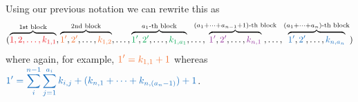 \begin{example}
\begin{center}
    \end{center}
    Using our previous notation we can rewrite this as 
    \[
        (
        \overbrace{\textcolor{Red}{1, 2, \dots, k_{1,1}}}^{1\text{st block}}, 
        \overbrace{\textcolor{Orange}{1'}, 
        \textcolor{Orange}{2'}, \dots, \textcolor{Orange}{k_{1,2}}}^{2\text{nd block}}, 
        \dots, 
        \overbrace{\textcolor{Green}{1'}, \textcolor{Green}{2'}, \dots, \textcolor{Green}{k_{1, a_1}}}^{a_1\text{-th block}},
        \dots,
        \hspace{-0.5cm}
        \overbrace{\textcolor{Purple}{1'}, \textcolor{Purple}{2'}, \dots, \textcolor{Purple}{k_{n, 1}}}^{(a_1 + \cdots + a_{n-1}+1)\text{-th block}}
        \hspace{-0.5cm}
        ,\dots,
        \overbrace{\textcolor{RoyalBlue}{1'}, \textcolor{RoyalBlue}{2'}, \dots, \textcolor{RoyalBlue}{k_{n, a_n}}}^{(a_1 + \cdots + a_n)\text{-th block}}
        )
    \]
    where again, for example, $\displaystyle \textcolor{Orange}{1' = k_{1,1}+1}$ whereas 
    $\displaystyle \textcolor{RoyalBlue}{1' =  \sum_{i}^{n-1}\sum_{j=1}^{a_i}k_{i, j} + (k_{n, 1} + \cdots + k_{n, (a_n-1)}) +1}$.
    

\end{example}
